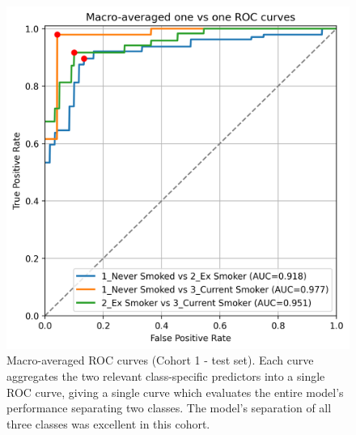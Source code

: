 \documentclass{article} %
\begin{document}
\begin{figure}[p]
    \centering
    \includegraphics[width=0.7\linewidth]{cohort1/test_macro_ovo_roc.png}
    \caption[Macro-averaged ROC curves (Cohort 1)]{Macro-averaged ROC curves (Cohort 1 - test set). Each curve aggregates the two relevant class-specific predictors into a single ROC curve, giving a single curve which evaluates the entire model's performance separating two classes. The model's separation of all three classes was excellent in this cohort.}
    \label{fig:cohort1-macro-rocs}
\end{figure}
\end{document}
